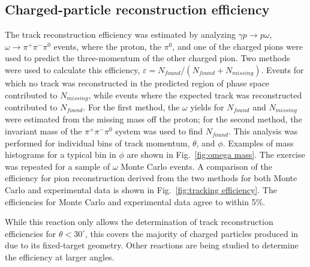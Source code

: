 \subsection{Charged-particle reconstruction efficiency  \label{sec:trackeff}}
The track reconstruction efficiency was estimated by analyzing $\gamma p \rightarrow p \omega$, $\omega\rightarrow\pi^+\pi^-\pi^0$ events, where the proton, the $\pi^0$, and one of the charged pions were used to predict the three-momentum of the other charged pion. Two methods were used to calculate this efficiency, $\varepsilon=N_{found}/(N_{found}+N_{missing})$.  Events for which no track was reconstructed in the predicted region of 
phase space contributed to $N_{missing}$, while events where the expected track was reconstructed contributed to $N_{found}$.  For the first method, the $\omega$ yields for $N_{found}$ and $N_{missing}$ were estimated from the missing mass off the 
proton; for the second method, the invariant mass of the $\pi^+\pi^-\pi^0$ system was used to find $N_{found}$.  This analysis was performed for individual bins of track momentum, $\theta$, and $\phi$.
Examples of mass histograms for a typical bin in $\phi$ are shown in Fig.~\ref{fig:omega mass}.  The exercise was repeated for a sample of $\omega$ Monte Carlo events.   A comparison of the efficiency for pion reconstruction derived from the 
two methods for both Monte Carlo and experimental data is shown in Fig.~\ref{fig:tracking efficiency}.  The efficiencies for Monte Carlo and experimental data 
agree to within 5\%.

While this reaction only allows the determination of track reconstruction efficiencies for $\theta < 30^\circ$, this covers the majority of charged particles produced in \gx{} due to its fixed-target geometry.  Other reactions are being studied to determine the efficiency at larger angles.

